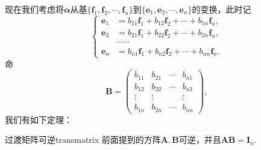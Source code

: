 \documentclass[12pt, a4paper,newtx]{ctexart}
\begin{document}
现在我们考虑将$\bm\alpha$从基$ \{ \bm f_1, \bm f_2, \cdots, \bm f_n \} $到$ \{ \bm e_1, \bm e_2, \cdots, \bm e_n \} $的变换，此时记\[\left\{
\begin{aligned}
	\bm e_1 &= b_{11}\bm f_1 + b_{12}\bm f_2 + \cdots + b_{1n} \bm f_n, \\
	\bm e_2 &= b_{21}\bm f_1 + b_{22}\bm f_2 + \cdots + b_{2n} \bm f_n, \\
	&\cdots\cdots \\
	\bm e_n &= b_{n1}\bm f_1 + b_{n2}\bm f_2 + \cdots + b_{nn} \bm f_n.
\end{aligned}
\right.
\]
命\[\bm B = \begin{pmatrix}
	b_{11} & b_{21} & \cdots & b_{n1} \\
	b_{12} & b_{22} & \cdots & b_{n2} \\
	\vdots & \vdots & & \vdots \\
	b_{1n} & b_{2n} & \cdots & b_{nn}
\end{pmatrix},
\]
我们有如下定理：\begin{theorem}{过渡矩阵可逆}{transmatrix}
	前面提到的方阵$\bm A,\bm B$可逆，并且$\bm{AB}=\bm I_n.$
\end{theorem}
\end{document}
